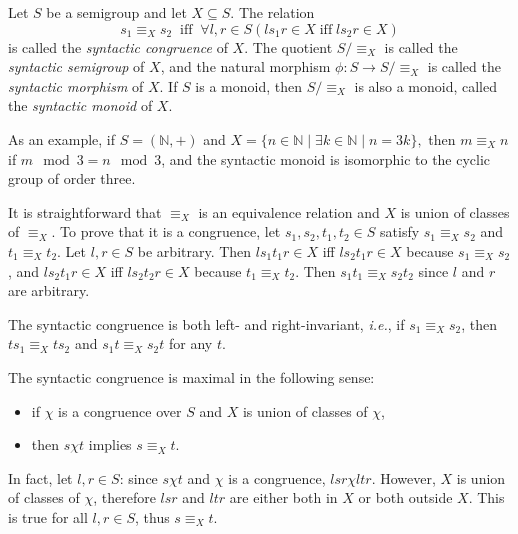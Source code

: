 \documentclass[12pt]{article}
\begin{document}
Let $S$ be a semigroup and let $X\subseteq S$.
The relation
\begin{equation} \label{eq:sc}
s_1\equiv_X s_2
\;\;\mathrm{iff}\;\;
\forall l,r\in S (ls_1r\in X\;\mathrm{iff}\;ls_2r\in X)
\end{equation}
is called the \emph{syntactic congruence} of $X$.
The quotient $S/\equiv_X$ is called the \emph{syntactic semigroup} of $X$,
and the natural morphism $\phi:S\to S/\equiv_X$
is called the \emph{syntactic morphism} of $X$.
If $S$ is a monoid, then $S/\equiv_X$ is also a monoid,
called the \emph{syntactic monoid} of $X$.

As an example,
if $S=(\mathbb{N},+)$ and
\begin{math}
X=\{n\in\mathbb{N}\mid\exists k\in\mathbb{N}\mid n=3k\},
\end{math}
then $m\equiv_X n$ if $m\mod 3=n\mod 3$,
and the syntactic monoid is isomorphic to the cyclic group of order three.

It is straightforward that $\equiv_X$
is an equivalence relation %
and $X$ is union of classes of $\equiv_X$.
To prove that it is a congruence, let $s_1,s_2,t_1,t_2\in S$
satisfy $s_1\equiv_X s_2$ and $t_1\equiv_X t_2$.
Let $l,r\in S$ be arbitrary.
Then $ls_1t_1r\in X$ iff $ls_2t_1r\in X$ because $s_1\equiv_X s_2$,
and $ls_2t_1r\in X$ iff $ls_2t_2r\in X$ because $t_1\equiv_X t_2$.
Then $s_1t_1\equiv_X s_2t_2$ since $l$ and $r$ are arbitrary.

The syntactic congruence is both left- and right-invariant,
\emph{i.e.}, if $s_1\equiv_Xs_2$,
then $ts_1\equiv_Xts_2$ and $s_1t\equiv_Xs_2t$ for any $t$.

The syntactic congruence is maximal in the following sense:
\begin{itemize}
\item if $\chi$ is a congruence over $S$ %
and $X$ is union of classes of $\chi$,
\item then $s\chi t$ implies $s\equiv_X t$.
\end{itemize}
In fact, let $l,r\in S$:
since $s\chi t$ and $\chi$ is a congruence, $lsr\chi ltr$.
However, $X$ is union of classes of $\chi$,
therefore $lsr$ and $ltr$
are either both in $X$ or both outside $X$.
This is true for all $l,r\in S$, thus $s\equiv_X t$.

\end{document}
